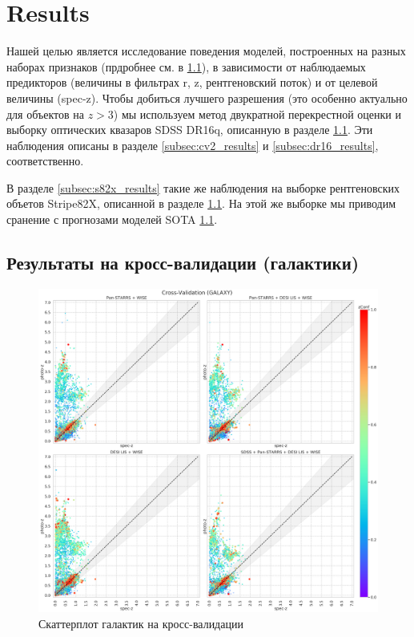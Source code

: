 \documentclass[fleqn,usenatbib]{mnras}
\begin{document}

\section{Results}
Нашей целью является исследование поведения моделей, построенных на разных наборах признаков (прдробнее см. в \ref{}), в зависимости от наблюдаемых предикторов (величины в фильтрах r, z, рентгеновский поток) и от целевой величины (spec-z). Чтобы добиться лучшего разрешения (это особенно актуально для объектов на $z > 3$) мы используем метод двукратной перекрестной оценки и выборку оптических квазаров SDSS DR16q, описанную в разделе \ref{}. Эти наблюдения описаны в разделе \ref{subsec:cv2_results} и \ref{subsec:dr16_results}, соответственно.

В разделе \ref{subsec:s82x_results} такие же наблюдения на выборке рентгеновских объетов Stripe82X, описанной в разделе \ref{}. На этой же выборке мы приводим сранение с прогнозами моделей SOTA \ref{}.

\subsection{Результаты на кросс-валидации (галактики)}

\begin{figure}
    \centering
    \includegraphics[width=0.9\linewidth]{images/scatterplots-cv2-gal.png}
    \caption{Скаттерплот галактик на кросс-валидации}
    \label{fig:my_label}
\end{figure}
\end{document}
